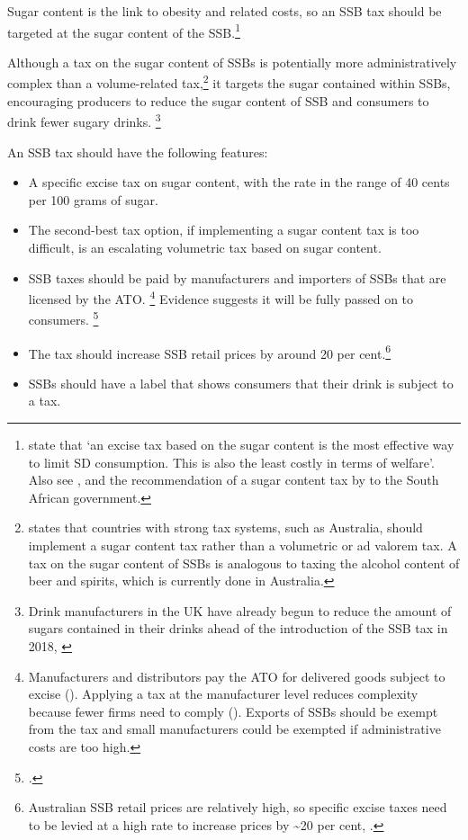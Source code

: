 \documentclass[embargoed]{grattan}
\begin{document}
Sugar content is the link to obesity and related costs, so an SSB tax should be targeted at the sugar content of the SSB.\footnote{\textcite{Bonnet2013Taxincidencestrategic} state that `an excise tax based on the sugar content is the most effective way to limit SD consumption.
This is also the least costly in terms of welfare'.
Also see \textcite{Smith2016SoftDrinksLevy}, \textcite{Organization2016FiscalPoliciesDiet} and the  recommendation of a sugar content tax by \textcite{SouthAfricaNationalTreasury2016TaxationSugarSweetened} to the South African government.}

Although a tax on the sugar content of SSBs is potentially more administratively complex than a volume-related tax,\footnote{\textcite{Organization2016FiscalPoliciesDiet} states that countries with strong tax systems, such as Australia, should implement a sugar content tax rather than a volumetric or ad valorem tax.
A tax on the sugar content of SSBs is analogous to taxing the alcohol content of beer and spirits, which is currently done in Australia.} it targets the sugar contained within SSBs, encouraging producers to reduce the sugar content of SSB and consumers to drink fewer sugary drinks.%
\footnote{Drink manufacturers in the UK have already begun to reduce the amount of sugars contained in their drinks ahead of the introduction of the SSB tax in 2018, \textcite{Team2016Sugarlevyworking}}

An SSB tax should have the following features:

\begin{itemize}
\item
  A specific excise tax on sugar content, with the rate in the range of 40 cents per 100 grams of sugar.
\item
  The second-best tax option, if implementing a sugar content tax is too difficult, is an escalating volumetric tax based on sugar content.
\item
  SSB taxes should be paid by manufacturers and importers of SSBs that are licensed by the ATO.%
\footnote{Manufacturers and distributors pay the ATO for delivered goods subject to excise (\textcite{Office2016Reportingexcisepaying}).
Applying a tax at the manufacturer level reduces complexity because fewer firms need to comply (\textcites{Freebairn2010Taxationobesity}{CnossenExcisetaxationAustralia}).
Exports of SSBs should be exempt from the tax and small manufacturers could be exempted if administrative costs are too high.} Evidence suggests it will be fully passed on to consumers.%
\footcites{Grogger2015Sodataxesprices}{Bergman2010Areexcisetaxes}{Berardi2016impactsodataxon}{Bonnet2013Taxincidencestrategic}{Solutions2016BestPracticesDesigning}
\item
  The tax should increase SSB retail prices by around 20 per cent.\footnote{\textcite{Organization2016FiscalPoliciesDiet}
Australian SSB retail prices are relatively high, so specific excise taxes need to be levied at a high rate to increase prices by \textasciitilde{}20 per cent, \textcite{Long2015Costeffectivenesssugar}.}
\item
  SSBs should have a label that shows consumers that their drink is subject to a tax.
\end{itemize}
\end{document}
